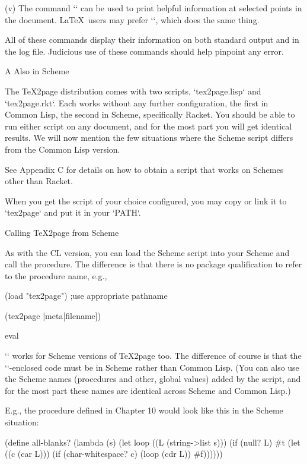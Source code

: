 \item(v) The command `\message`
can be used to print helpful information at selected
points in the document.   \LaTeX\ users may
prefer `\typeout`, which does the same thing.

All of these commands display their information
on both standard output and in the log file.
Judicious use of these commands
should help pinpoint any error.


\beginchapter A Also in Scheme

The \TeX2page distribution comes with two scripts,
`tex2page.lisp` and `tex2page.rkt`. Each works without any
further configuration, the first in Common Lisp, the second in
Scheme, specifically Racket.
You should be able to run either script on any document, and for
the most part you will get identical results. We will now mention
the few situations where the Scheme script differs from the
Common Lisp version.

See Appendix C for details on how to obtain a script that works
on Schemes other than Racket.

When you get the script of your choice configured, you may copy or link it to
`tex2page` and put it in your `PATH`. 

\beginsection Calling \TeX2page from Scheme

%
As with the CL version, you can load the Scheme script into your
Scheme and call the  procedure. The difference is
that there is no package qualification to refer to the procedure
name, e.g.,

\begintts
(load "tex2page") ;use appropriate pathname

(tex2page |meta[filename])
\endtt

\beginsection  eval

`\eval` works for Scheme versions of \TeX2page too. The
difference of course is that the `\eval`-enclosed code must be in
Scheme rather than Common Lisp. (You can also use the
Scheme names (procedures and other, global values) added by the
script, and for the most part these names are identical across
Scheme and Common Lisp.) 

E.g., the  procedure
defined in Chapter 10 would look like this in the Scheme
situation:

\begintts
(define all-blanks?
  (lambda (s)
    (let loop ((L (string->list s)))
      (if (null? L) #t
          (let ((c (car L)))
            (if (char-whitespace? c) (loop (cdr L))
                #f))))))
\endtt

